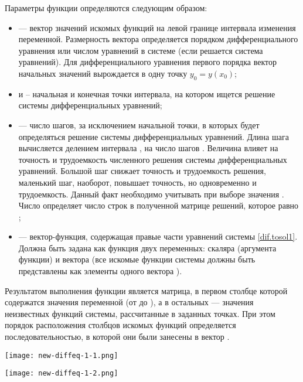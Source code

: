 Параметры функции  определяются следующим образом:
\begin{itemize}[label={}]
	\item {} --- вектор значений искомых функций на левой границе интервала изменения переменной. Размерность вектора определяется порядком дифференциального уравнения или числом уравнений в системе (если решается система уравнений). Для дифференциального уравнения первого порядка вектор начальных значений вырождается в одну точку $y_0 = y(x_0)$;
	\item {} и  – начальная и конечная точки интервала, на котором ищется решение системы дифференциальных уравнений;
	\item {} --- число шагов, за исключением начальной точки, в которых будет определяться решение системы дифференциальных уравнений. Длина шага вычисляется делением интервала , на число шагов . Величина  влияет на точность и трудоемкость численного решения системы дифференциальных уравнений. Большой шаг снижает точность и трудоемкость решения, маленький шаг, наоборот, повышает точность, но одновременно и трудоемкость. Данный факт необходимо учитывать при выборе значения . Число  определяет число строк в полученной матрице решений, которое равно ;
	\item {} --- вектор-функция, содержащая правые части уравнений системы \ref{dif.tosol1}. Должна быть задана как функция двух переменных: скаляра  (аргумента функции) и вектора  (все искомые функции системы должны быть представлены как элементы одного вектора ).
\end{itemize}

Результатом выполнения функции  является матрица, в первом столбце которой содержатся значения переменной  (от  до ), а в остальных --- значения неизвестных функций системы, рассчитанные в заданных точках. При этом порядок расположения столбцов искомых функций определяется последовательностью, в которой они были занесены в вектор .


\begin{center}
	\texttt{[image: new-diffeq-1-1.png]}
\end{center}
\begin{center}
	\texttt{[image: new-diffeq-1-2.png]}
\end{center}

